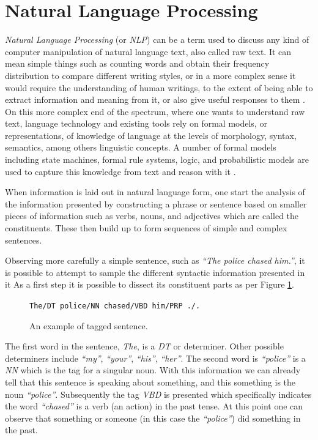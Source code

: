 \documentclass[11pt,a4paper,openright]{memoir}
\begin{document}
%
%
%
%


\section{Natural Language Processing}
\label{section:nlp}

\emph{Natural Language Processing} (or \emph{NLP}) can be a term used to discuss any kind of computer manipulation of natural language text, also called raw text. It can mean simple things such as counting words and obtain their frequency distribution to compare different writing styles, or in a more complex sense it would require the understanding of human writings, to the extent of being able to extract information and meaning from it, or also give useful responses to them \cite{BirdKleinLoper09}. On this more complex end of the spectrum, where one wants to understand raw text, language technology and existing tools rely on formal models, or representations, of knowledge of language at the levels of morphology, syntax, semantics, among others linguistic concepts. A number of formal models including state machines, formal rule systems, logic, and probabilistic models are used to capture this knowledge from text and reason with it \cite{Jurafsky:2000:SLP:555733}.

When information is laid out in natural language form, one start the analysis of the information presented by constructing a phrase or sentence based on smaller pieces of information such as verbs, nouns, and adjectives which are called the constituents. These then build up to form sequences of simple and complex sentences.

Observing more carefully a simple sentence, such as \emph{\enquote{The police chased him.}}, it is possible to attempt to sample the different syntactic information presented in it As a first step it is possible to dissect its constituent parts as per Figure \ref{fig:pos_tags}.

\begin{figure}[!htbp]
  \centering
    \texttt{The/DT police/NN chased/VBD him/PRP ./.}
  \caption[An example of tagged sentence.]{An example of tagged sentence.}
  \label{fig:pos_tags}
\end{figure}

The first word in the sentence, \emph{The}, is a \emph{DT} or determiner. Other possible determiners include \emph{\enquote{my}}, \emph{\enquote{your}}, \emph{\enquote{his}}, \emph{\enquote{her}}. The second word is \emph{\enquote{police}} is a \emph{NN} which is the tag for a singular noun. With this information we can already tell that this sentence is speaking about something, and this something is the noun \emph{\enquote{police}}. Subsequently the tag \emph{VBD} is presented which specifically indicates the word \emph{\enquote{chased}} is a verb (an action) in the past tense. At this point one can observe that something or someone (in this case the \emph{\enquote{police}}) did something in the past.
\end{document}

